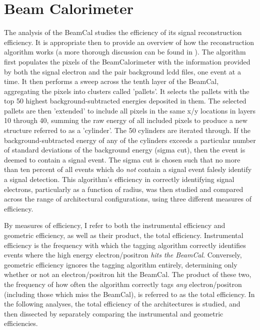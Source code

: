 \documentclass{report}
\begin{document}
        \section{Beam Calorimeter}
            The analysis of the BeamCal studies the efficiency of its signal reconstruction efficiency. It is appropriate then to provide an overview of how the reconstruction algorithm works (a more thorough discussion can be found in \cite{bogert_thesis}). The algorithm first populates the pixels of the BeamCalorimeter with the information provided by both the signal electron and the pair background lcdd files, one event at a time. It then performs a sweep across the tenth layer of the BeamCal, aggregating the pixels into clusters called 'pallets'. It selects the pallets with the top 50 highest background-subtracted energies deposited in them. The selected pallets are then 'extended' to include all pixels in the same x/y locations in layers 10 through 40, summing the raw energy of all included pixels to produce a new structure referred to as a 'cylinder'. The 50 cylinders are iterated through. If the background-subtracted energy of any of the cylinders exceeds a particular number of standard deviations of the background energy (sigma cut), then the event is deemed to contain a signal event. The sigma cut is chosen such that no more than ten percent of all events which do \textit{not} contain a signal event falesly identify a signal detection. This algorithm's efficiency in correctly identifying signal electrons, particularly as a function of radius, was then studied and compared across the range of architectural configurations, using three different measures of efficiency.

            By measures of efficiency, I refer to both the instrumental efficiency and geometric efficiency, as well as their product, the total efficiency. Instrumental efficiency is the frequency with which the tagging algorithm correctly identifies events where the high energy electron/positron \textit{hits the BeamCal}. Conversely, geometric efficiency ignores the tagging algorithm entirely, determining only whether or not an electron/positron hit the BeamCal. The product of these two, the frequency of how often the algorithm correctly tags \textit{any} electron/positron (including those which miss the BeamCal), is referred to as the total efficiency. In the following analyses, the total efficiency of the architectures is studied, and then dissected by separately comparing the instrumental and geometric efficiencies.
\end{document}
